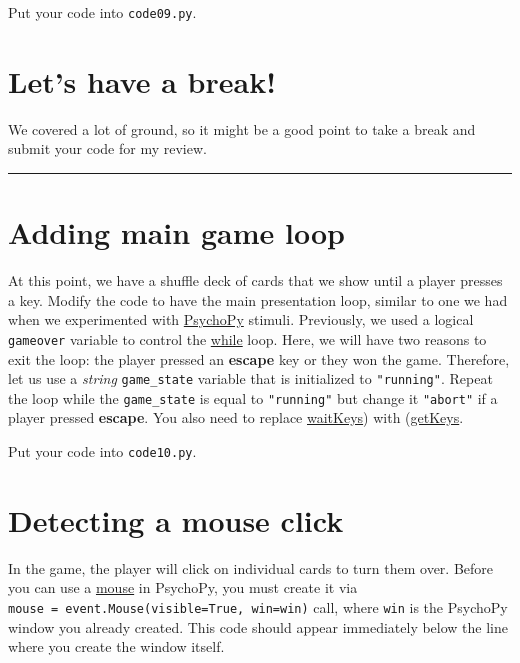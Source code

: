 \documentclass[
]{book}
\begin{document}
Put your code into \texttt{code09.py}.

\hypertarget{lets-have-a-break}{%
\section{Let's have a break!}\label{lets-have-a-break}}

We covered a lot of ground, so it might be a good point to take a break and submit your code for my review.

\begin{center}\rule{0.5\linewidth}{0.5pt}\end{center}

\hypertarget{adding-main-game-loop}{%
\section{Adding main game loop}\label{adding-main-game-loop}}

At this point, we have a shuffle deck of cards that we show until a player presses a key. Modify the code to have the main presentation loop, similar to one we had when we experimented with \protect\hyperlink{psychopy-basics}{PsychoPy} stimuli. Previously, we used a logical \texttt{gameover} variable to control the \protect\hyperlink{ux5cux23while-loop}{while} loop. Here, we will have two reasons to exit the loop: the player pressed an \textbf{escape} key or they won the game. Therefore, let us use a \emph{string} \texttt{game\_state} variable that is initialized to \texttt{"running"}. Repeat the loop while the \texttt{game\_state} is equal to \texttt{"running"} but change it \texttt{"abort"} if a player pressed \textbf{escape}. You also need to replace \href{https://psychopy.org/api/event.html\#psychopy.event.waitKeys}{waitKeys}) with (\href{https://psychopy.org/api/event.html\#psychopy.event.getKeys}{getKeys}.

Put your code into \texttt{code10.py}.

\hypertarget{psychopy-mouse}{%
\section{Detecting a mouse click}\label{psychopy-mouse}}

In the game, the player will click on individual cards to turn them over. Before you can use a \href{https://psychopy.org/api/event.html\#psychopy.event.Mouse}{mouse} in PsychoPy, you must create it via \texttt{mouse\ =\ event.Mouse(visible=True,\ win=win)} call, where \texttt{win} is the PsychoPy window you already created. This code should appear immediately below the line where you create the window itself.
\end{document}
